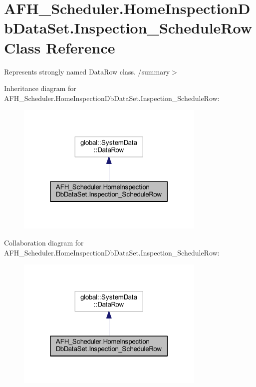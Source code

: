 \section{A\+F\+H\+\_\+\+Scheduler.\+Home\+Inspection\+Db\+Data\+Set.\+Inspection\+\_\+\+Schedule\+Row Class Reference}
\label{class_a_f_h___scheduler_1_1_home_inspection_db_data_set_1_1_inspection___schedule_row}


Represents strongly named Data\+Row class. /summary$>$  




Inheritance diagram for A\+F\+H\+\_\+\+Scheduler.\+Home\+Inspection\+Db\+Data\+Set.\+Inspection\+\_\+\+Schedule\+Row\+:
\nopagebreak
\begin{figure}[H]
\begin{center}
\leavevmode
\includegraphics[width=256pt]{class_a_f_h___scheduler_1_1_home_inspection_db_data_set_1_1_inspection___schedule_row__inherit__graph}
\end{center}
\end{figure}


Collaboration diagram for A\+F\+H\+\_\+\+Scheduler.\+Home\+Inspection\+Db\+Data\+Set.\+Inspection\+\_\+\+Schedule\+Row\+:
\nopagebreak
\begin{figure}[H]
\begin{center}
\leavevmode
\includegraphics[width=256pt]{class_a_f_h___scheduler_1_1_home_inspection_db_data_set_1_1_inspection___schedule_row__coll__graph}
\end{center}
\end{figure}
